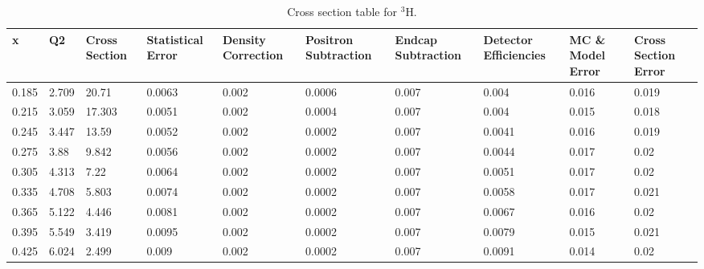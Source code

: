 \begin{sidewaystable}[]
	\caption{Cross section table for $^3$H.}\label{CST_He3}
	\begin{tabular}{|p{1cm}|p{1cm}|p{1.5cm}|p{1.5cm}|p{2cm}|p{2cm}|p{1.5cm}|p{1.5cm}|p{2.5cm}|p{2.5cm}|}
		\hline
		x     & Q2     & Cross Section & Statistical Error & Density Correction & Positron Subtraction & Endcap Subtraction & Detector Efficiencies & MC \& Model Error & Cross Section Error \\ \hline
		0.185 & 2.709  & 20.71         & 0.0063            & 0.002              & 0.0006               & 0.007              & 0.004                 & 0.016             & 0.019               \\ \hline
		0.215 & 3.059  & 17.303        & 0.0051            & 0.002              & 0.0004               & 0.007              & 0.004                 & 0.015             & 0.018               \\ \hline
		0.245 & 3.447  & 13.59         & 0.0052            & 0.002              & 0.0002               & 0.007              & 0.0041                & 0.016             & 0.019               \\ \hline
		0.275 & 3.88   & 9.842         & 0.0056            & 0.002              & 0.0002               & 0.007              & 0.0044                & 0.017             & 0.02                \\ \hline
		0.305 & 4.313  & 7.22          & 0.0064            & 0.002              & 0.0002               & 0.007              & 0.0051                & 0.017             & 0.02                \\ \hline
		0.335 & 4.708  & 5.803         & 0.0074            & 0.002              & 0.0002               & 0.007              & 0.0058                & 0.017             & 0.021               \\ \hline
		0.365 & 5.122  & 4.446         & 0.0081            & 0.002              & 0.0002               & 0.007              & 0.0067                & 0.016             & 0.02                \\ \hline
		0.395 & 5.549  & 3.419         & 0.0095            & 0.002              & 0.0002               & 0.007              & 0.0079                & 0.015             & 0.021               \\ \hline
		0.425 & 6.024  & 2.499         & 0.009             & 0.002              & 0.0002               & 0.007              & 0.0091                & 0.014             & 0.02                \\ \hline

\end{tabular}
\end{sidewaystable}
